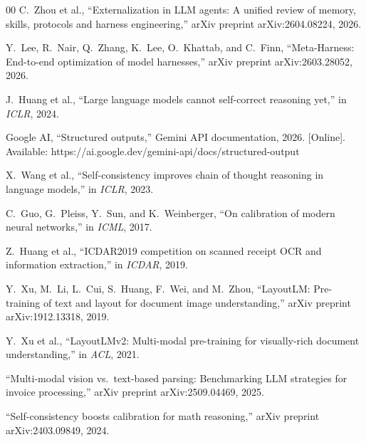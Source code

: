 \documentclass[conference]{IEEEtran}
\begin{document}
\begin{thebibliography}{00}
 C.~Zhou et al., ``Externalization in LLM agents: A unified review of memory, skills, protocols and harness engineering,'' arXiv preprint arXiv:2604.08224, 2026.

 Y.~Lee, R.~Nair, Q.~Zhang, K.~Lee, O.~Khattab, and C.~Finn, ``Meta-Harness: End-to-end optimization of model harnesses,'' arXiv preprint arXiv:2603.28052, 2026.

 J.~Huang et al., ``Large language models cannot self-correct reasoning yet,'' in \emph{ICLR}, 2024.

 Google AI, ``Structured outputs,'' Gemini API documentation, 2026. [Online]. Available: https://ai.google.dev/gemini-api/docs/structured-output

 X.~Wang et al., ``Self-consistency improves chain of thought reasoning in language models,'' in \emph{ICLR}, 2023.

 C.~Guo, G.~Pleiss, Y.~Sun, and K.~Weinberger, ``On calibration of modern neural networks,'' in \emph{ICML}, 2017.

 Z.~Huang et al., ``ICDAR2019 competition on scanned receipt OCR and information extraction,'' in \emph{ICDAR}, 2019.

 Y.~Xu, M.~Li, L.~Cui, S.~Huang, F.~Wei, and M.~Zhou, ``LayoutLM: Pre-training of text and layout for document image understanding,'' arXiv preprint arXiv:1912.13318, 2019.

 Y.~Xu et al., ``LayoutLMv2: Multi-modal pre-training for visually-rich document understanding,'' in \emph{ACL}, 2021.

 ``Multi-modal vision vs.\ text-based parsing: Benchmarking LLM strategies for invoice processing,'' arXiv preprint arXiv:2509.04469, 2025.

 ``Self-consistency boosts calibration for math reasoning,'' arXiv preprint arXiv:2403.09849, 2024.

\end{thebibliography}
\end{document}
